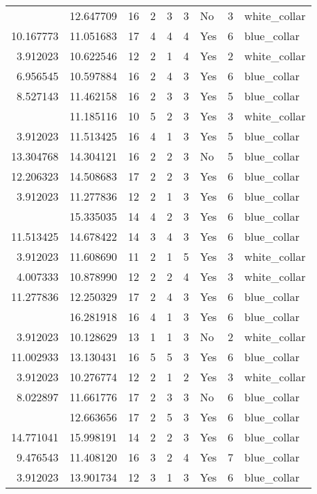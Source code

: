 \documentclass[
]{article}
\begin{document}
\begin{longtable}[t]{rrrrrllrl}
\addlinespace
8.860783 & 12.647709 & 16 & 2 & 3 & 3 & No & 3 & white\_collar\\
10.167773 & 11.051683 & 17 & 4 & 4 & 4 & Yes & 6 & blue\_collar\\
3.912023 & 10.622546 & 12 & 2 & 1 & 4 & Yes & 2 & white\_collar\\
6.956545 & 10.597884 & 16 & 2 & 4 & 3 & Yes & 6 & blue\_collar\\
8.527143 & 11.462158 & 16 & 2 & 3 & 3 & Yes & 5 & blue\_collar\\
\addlinespace
7.625595 & 11.185116 & 10 & 5 & 2 & 3 & Yes & 3 & white\_collar\\
3.912023 & 11.513425 & 16 & 4 & 1 & 3 & Yes & 5 & blue\_collar\\
13.304768 & 14.304121 & 16 & 2 & 2 & 3 & No & 5 & blue\_collar\\
12.206323 & 14.508683 & 17 & 2 & 2 & 3 & Yes & 6 & blue\_collar\\
3.912023 & 11.277836 & 12 & 2 & 1 & 3 & Yes & 6 & blue\_collar\\
\addlinespace
12.449215 & 15.335035 & 14 & 4 & 2 & 3 & Yes & 6 & blue\_collar\\
11.513425 & 14.678422 & 14 & 3 & 4 & 3 & Yes & 6 & blue\_collar\\
3.912023 & 11.608690 & 11 & 2 & 1 & 5 & Yes & 3 & white\_collar\\
4.007333 & 10.878990 & 12 & 2 & 2 & 4 & Yes & 3 & white\_collar\\
11.277836 & 12.250329 & 17 & 2 & 4 & 3 & Yes & 6 & blue\_collar\\
\addlinespace
3.912023 & 16.281918 & 16 & 4 & 1 & 3 & Yes & 6 & blue\_collar\\
3.912023 & 10.128629 & 13 & 1 & 1 & 3 & No & 2 & white\_collar\\
11.002933 & 13.130431 & 16 & 5 & 5 & 3 & Yes & 6 & blue\_collar\\
3.912023 & 10.276774 & 12 & 2 & 1 & 2 & Yes & 3 & white\_collar\\
8.022897 & 11.661776 & 17 & 2 & 3 & 3 & No & 6 & blue\_collar\\
\addlinespace
11.513425 & 12.663656 & 17 & 2 & 5 & 3 & Yes & 6 & blue\_collar\\
14.771041 & 15.998191 & 14 & 2 & 2 & 3 & Yes & 6 & blue\_collar\\
9.476543 & 11.408120 & 16 & 3 & 2 & 4 & Yes & 7 & blue\_collar\\
3.912023 & 13.901734 & 12 & 3 & 1 & 3 & Yes & 6 & blue\_collar\\

\end{longtable}
\end{document}
